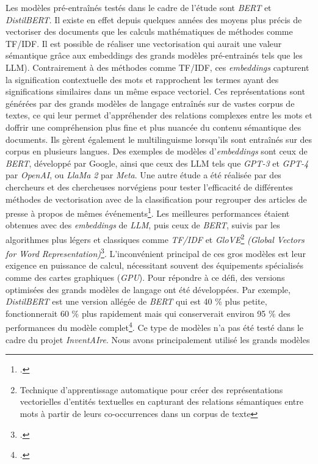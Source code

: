 Les modèles pré-entraînés testés dans le cadre de l'étude sont
\emph{BERT} et \emph{DistilBERT}. Il existe en effet depuis quelques années des moyens
plus précis de vectoriser des documents que les calculs mathématiques de
méthodes comme TF/IDF. Il est possible de réaliser une \gls{vectorisation} qui
aurait une valeur sémantique grâce aux \gls{embeddings}
des grands modèles pré-entrainés tels que les \gls{LLM}). Contrairement à des méthodes comme TF/IDF, ces \emph{embeddings}
capturent la signification contextuelle des mots et rapprochent les
termes ayant des significations similaires dans un même espace
vectoriel. Ces représentations sont générées par des grands modèles de
langage entraînés sur de vastes corpus de textes, ce qui leur permet
d'appréhender des relations complexes entre les mots et
d\textquotesingle offrir une compréhension plus fine et plus nuancée du
contenu sémantique des documents. Ils gèrent également le
multilinguisme lorsqu'ils sont entraînés sur des corpus en plusieurs langues.
Des exemples de modèles d'\emph{embeddings} sont ceux de \emph{BERT},
développé par Google, ainsi que ceux des \gls{LLM} tels
que \emph{GPT-3} et \emph{GPT-4} par \emph{OpenAI}, ou \emph{LlaMa}
\emph{2} par \emph{Meta}. Une autre étude a été réalisée par des
chercheurs et des chercheuses norvégiens pour tester l'efficacité de
différentes méthodes de vectorisation avec de la classification pour
regrouper des articles de presse à propos de mêmes
événements\footcite{tarekegn_large_2024}.
Les meilleures performances étaient obtenues avec des \emph{embeddings} de
\emph{LLM}, puis ceux de \emph{BERT}, suivis par les algorithmes plus
légers et classiques comme \emph{TF/IDF} et \emph{GloVE}\footnote{Technique d'apprentissage automatique pour créer des représentations vectorielles d'entités textuelles en capturant des relations sémantiques entre mots à partir de leurs co-occurrences dans un corpus de texte}
\emph{(Global Vectors for Word Representation)}\footcite{tarekegn_large_2024}.
L'inconvénient principal de ces gros modèles est leur exigence en
puissance de calcul, nécessitant souvent des équipements spécialisés
comme des cartes graphiques (\emph{GPU}). Pour répondre à ce défi, des
versions optimisées des grands modèles de langage ont été développées.
Par exemple, \emph{DistilBERT} est une version allégée de \emph{BERT}
qui est 40 \% plus petite, fonctionnerait 60 \% plus rapidement mais qui
conserverait environ 95 \% des performances du modèle
complet\footcite{noauthor_distilbert_nodate}.
Ce type de modèles n'a pas été testé dans le cadre du projet
\emph{InventAIre}. Nous avons principalement utilisé les grands modèles
